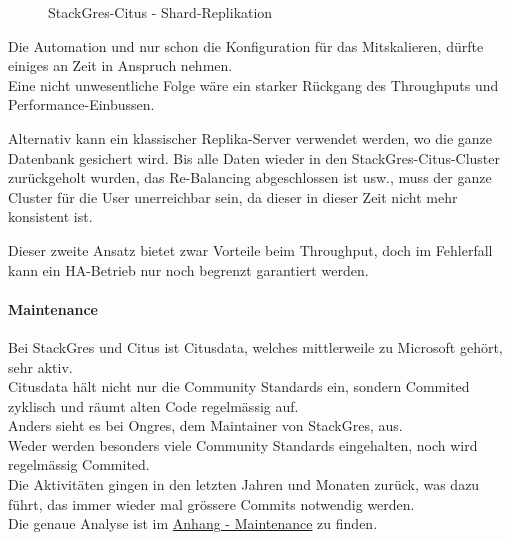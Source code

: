 \begin{flushleft}
\begin{flushleft}
\begin{flushleft}
\begin{figure}[H]
                \caption{StackGres-Citus - Shard-Replikation}
                \label{fig:stackgres_shard_replication}
            \end{figure}
            Die Automation und nur schon die Konfiguration für das Mitskalieren, dürfte einiges an Zeit in Anspruch nehmen.\\
            Eine nicht unwesentliche Folge wäre ein starker Rückgang des Throughputs und Performance-Einbussen.
        \end{flushleft}
        \begin{flushleft}
            Alternativ kann ein klassischer Replika-Server verwendet werden, wo die ganze Datenbank gesichert wird.
            Bis alle Daten wieder in den StackGres-Citus-Cluster zurückgeholt wurden, das Re-Balancing abgeschlossen ist usw.,
            muss der ganze Cluster für die User unerreichbar sein, da dieser in dieser Zeit nicht mehr konsistent ist.
        \end{flushleft}
        \begin{flushleft}
            Dieser zweite Ansatz bietet zwar Vorteile beim Throughput, doch im Fehlerfall kann ein HA-Betrieb nur noch begrenzt garantiert werden.
        \end{flushleft}
    \end{flushleft}
\end{flushleft}
\begin{flushleft}
    \paragraph{Maintenance}
    Bei StackGres und Citus ist Citusdata, welches mittlerweile zu Microsoft gehört, sehr aktiv.\\
    Citusdata hält nicht nur die Community Standards ein, sondern Commited zyklisch und räumt alten Code regelmässig auf.\\
    Anders sieht es bei Ongres, dem Maintainer von StackGres, aus.\\
    Weder werden besonders viele Community Standards eingehalten, noch wird regelmässig Commited.\\
    Die Aktivitäten gingen in den letzten Jahren und Monaten zurück, was dazu führt, das immer wieder mal grössere Commits notwendig werden.\\
    Die genaue Analyse ist im \hyperref[subsec:maintenance_stackgres_citus]{Anhang - Maintenance} zu finden.
\end{flushleft}
